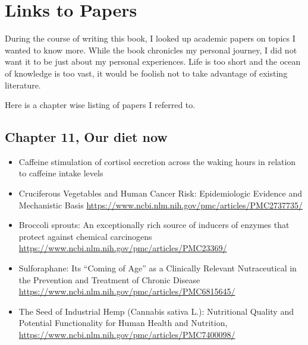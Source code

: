 \documentclass[
  oneside]{book}
\begin{document}
\hypertarget{links-to-papers}{%
\chapter{Links to Papers}\label{links-to-papers}}

During the course of writing this book, I looked up academic papers on topics I wanted to know more. While the book chronicles my personal journey, I did not want it to be just about my personal experiences. Life is too short and the ocean of knowledge is too vast, it would be foolish not to take advantage of existing literature.

Here is a chapter wise listing of papers I referred to.

\hypertarget{chapter-11-our-diet-now}{%
\section{Chapter 11, Our diet now}\label{chapter-11-our-diet-now}}

\begin{itemize}
\item
  Caffeine stimulation of cortisol secretion across the waking hours in relation to caffeine intake levels
\item
  Cruciferous Vegetables and Human Cancer Risk: Epidemiologic Evidence and Mechanistic Basis
  \url{https://www.ncbi.nlm.nih.gov/pmc/articles/PMC2737735/}
\item
  Broccoli sprouts: An exceptionally rich source of inducers of enzymes that protect against chemical carcinogens \url{https://www.ncbi.nlm.nih.gov/pmc/articles/PMC23369/}
\item
  Sulforaphane: Its ``Coming of Age'' as a Clinically Relevant Nutraceutical in the Prevention and Treatment of Chronic Disease \url{https://www.ncbi.nlm.nih.gov/pmc/articles/PMC6815645/}
\item
  The Seed of Industrial Hemp (Cannabis sativa L.): Nutritional Quality and Potential Functionality for Human Health and Nutrition, \url{https://www.ncbi.nlm.nih.gov/pmc/articles/PMC7400098/}
\end{itemize}
\end{document}
